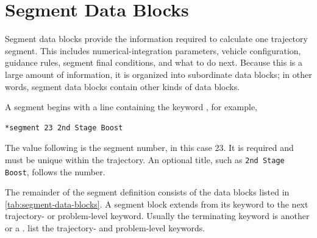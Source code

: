 \section{Segment Data Blocks}\label{sec:segment-data-blocks}

Segment data blocks provide the information required to calculate one trajectory
segment. This includes numerical-integration parameters, vehicle configuration,
guidance rules, segment final conditions, and what to do next. Because this is a
large amount of information, it is organized into subordinate data blocks; in other
words, segment data blocks contain other kinds of data blocks.

A segment begins with a line containing the keyword , for
example,

\begin{lstlisting}[style=taosmanual]
*segment 23 2nd Stage Boost
\end{lstlisting}

The value following  is the segment number, in this case
23. It is required and must be unique within the trajectory. An optional title, such as
\texttt{2nd Stage Boost}, follows the number.

The remainder of the segment definition consists of the data blocks listed in
\cref{tab:segment-data-blocks}. A segment block extends from its
 keyword to the next trajectory- or problem-level keyword.
Usually the terminating keyword is another  or a
. 
 list the trajectory- and
problem-level keywords.

